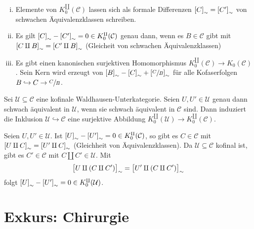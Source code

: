 \begin{bemerkung}
	\begin{enumerate}[(i)]
		\item Elemente von $K_0^\amalg(\mathcal{C})$ lassen sich als formale Differenzen $\benbrace*{C}_\sim = \benbrace*{C'}_\sim$ von schwachen Äquivalenzklassen schreiben.
		\item Es gilt $\benbrace*{C}_\sim - \benbrace*{C'}_\sim =0 \in K^\amalg_0(\mathcal{C})$ genau dann, wenn es $B \in \mathcal{C}$ gibt mit $\benbrace*{C \amalg B}_\sim = \benbrace*{C' \amalg B}_\sim $ (Gleicheit von schwachen Äquivalenzklassen)
		\item Es gibt einen kanonischen surjektiven Homomorphismus $K_0^\amalg(\mathcal{C}) \to K_0(\mathcal{C})$.
		Sein Kern wird erzeugt von $\benbrace*{B}_\sim - \benbrace*{C}_\sim  + \benbrace*{\sfrac{C}{B}}_\sim$ für alle Kofaserfolgen $B \hookrightarrow C \to \sfrac{C}{B}$.
	\end{enumerate}
\end{bemerkung}

\begin{lemma}
	Sei $\mathcal{U} \subseteq \mathcal{C}$ eine kofinale Waldhausen-Unterkategorie.
	Seien $U, U' \in \mathcal{U}$ genau dann schwach äquivalent in $\mathcal{U}$, wenn sie schwach äquivalent in $\mathcal{C}$ sind.
	Dann induziert die Inklusion $\mathcal{U} \hookrightarrow \mathcal{C}$ eine surjektive Abbildung $K_0^\amalg(\mathcal{U}) \to K_0^\amalg(\mathcal{C})$.
\end{lemma}
\begin{beweis}
	Seien $U,U' \in \mathcal{U}$.
	Ist $\benbrace*{U}_\sim - \benbrace*{U'}_\sim =0 \in K_0^\amalg(\mathcal{C})$, so gibt es $C \in \mathcal{C}$ mit $\benbrace*{U \amalg C}_\sim = \benbrace*{U' \amalg C}_\sim$ (Gleichheit von Äquivalenzklassen).
	Da $\mathcal{U} \subseteq \mathcal{C}$ kofinal ist, gibt es $C' \in \mathcal{C}$ mit $C \amalg C' \in \mathcal{U}$.
	Mit
	\[
		\benbrace[\big]{U \amalg (C \amalg C')}_\sim = \benbrace[\big]{U' \amalg (C \amalg C')}_\sim
	\]
	folgt $\benbrace*{U}_\sim - \benbrace*{U'}_\sim =0 \in K_0^\amalg(\mathcal{U})$.
\end{beweis}
\newpage
\section{Exkurs: Chirurgie} %
\label{sec:6}

